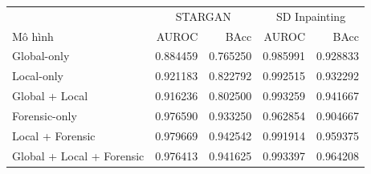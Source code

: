 \small
\begin{tabular}{lrrrr}
\toprule
 & \multicolumn{2}{c}{STARGAN} & \multicolumn{2}{c}{SD Inpainting} \\
Mô hình & AUROC & BAcc & AUROC & BAcc \\
\midrule
Global-only & 0.884459 & 0.765250 & 0.985991 & 0.928833 \\
Local-only & 0.921183 & 0.822792 & 0.992515 & 0.932292 \\
Global + Local & 0.916236 & 0.802500 & 0.993259 & 0.941667 \\
Forensic-only & 0.976590 & 0.933250 & 0.962854 & 0.904667 \\
Local + Forensic & 0.979669 & 0.942542 & 0.991914 & 0.959375 \\
Global + Local + Forensic & 0.976413 & 0.941625 & 0.993397 & 0.964208 \\
\bottomrule
\end{tabular}
